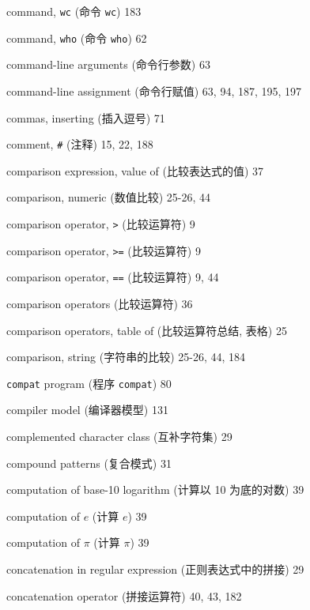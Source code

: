 \begin{multicols}{2}
\hangindent=2pc  command, \verb'wc' (命令 \verb'wc') 183


\hangindent=2pc  command, \verb'who' (命令 \verb'who') 62

\hangindent=2pc  command-line arguments (命令行参数) 63

\hangindent=2pc  command-line assignment (命令行赋值)
63, 94, 187, 195, 197

\hangindent=2pc  commas, inserting (插入逗号) 71

\hangindent=2pc  comment, \verb'#' (注释) 15, 22, 188

\hangindent=2pc  comparison expression, value of
(比较表达式的值) 37

\hangindent=2pc  comparison, numeric (数值比较) 25-26, 44

\hangindent=2pc  comparison operator, \verb'>' (比较运算符) 9

\hangindent=2pc  comparison operator, \verb'>=' (比较运算符) 9

\hangindent=2pc  comparison operator, \verb'==' (比较运算符) 9, 44

\hangindent=2pc  comparison operators (比较运算符) 36

\hangindent=2pc  comparison operators, table of (比较运算符总结,
 表格) 25

\hangindent=2pc  comparison, string (字符串的比较) 25-26, 44, 184

\hangindent=2pc  \verb'compat' program (程序 \verb'compat') 80

\hangindent=2pc  compiler model (编译器模型) 131

\hangindent=2pc  complemented character class (互补字符集) 29

\hangindent=2pc  compound patterns (复合模式) 31

\hangindent=2pc  computation of base-10 logarithm (计算以 10
为底的对数) 39

\hangindent=2pc  computation of $e$ (计算 $e$) 39

\hangindent=2pc  computation of $\pi$ (计算 $\pi$) 39

\hangindent=2pc  concatenation in regular expression
(正则表达式中的拼接) 29

\hangindent=2pc  concatenation operator (拼接运算符) 40, 43, 182


\end{multicols}
